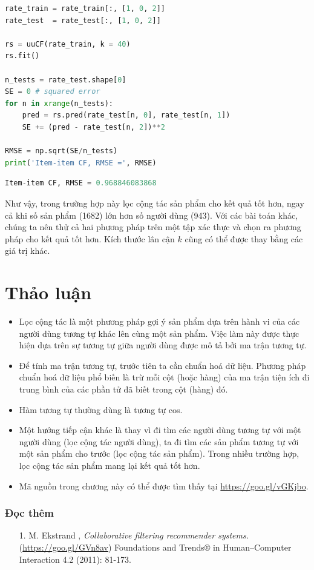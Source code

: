 \begin{lstlisting}[language=Python]
rate_train = rate_train[:, [1, 0, 2]]
rate_test  = rate_test[:, [1, 0, 2]]

rs = uuCF(rate_train, k = 40)
rs.fit()

n_tests = rate_test.shape[0]
SE = 0 # squared error
for n in xrange(n_tests):
    pred = rs.pred(rate_test[n, 0], rate_test[n, 1])
    SE += (pred - rate_test[n, 2])**2 

RMSE = np.sqrt(SE/n_tests)
print('Item-item CF, RMSE =', RMSE)
\end{lstlisting}
\kq 
\begin{lstlisting}[language=Python]
Item-item CF, RMSE = 0.968846083868
\end{lstlisting}
Như vậy, trong trường hợp này lọc cộng tác sản phẩm cho kết quả tốt
hơn, ngay cả khi số sản phẩm (1682) lớn hơn số người dùng (943).
Với các bài toán khác, chúng ta nên thử cả hai phương pháp trên một tập xác thực và chọn
ra phương pháp cho kết quả tốt hơn. Kích thước lân cận $k$ cũng có thể được thay bằng các giá trị khác. 
 
 
\section{Thảo luận}
\label{sec:24_discuss}
\begin{itemize}
    \item Lọc cộng tác là một phương pháp gợi ý sản phẩm dựa trên hành vi của các người dùng tương tự khác lên cùng một
    sản phẩm. Việc làm này được thực hiện dựa trên sự tương tự giữa người dùng được mô tả bởi ma trận tương tự.
 
    \item Để tính ma trận tương tự, trước tiên ta cần chuẩn hoá dữ
    liệu. Phương pháp chuẩn hoá dữ liệu phổ biến là trừ mỗi cột (hoặc hàng) của ma trận tiện ích đi trung bình của các phần tử đã biết trong cột (hàng) đó. 
 
    \item Hàm tương tự thường dùng là tương tự cos. 
 
    \item Một hướng tiếp cận khác là thay vì đi tìm các người dùng tương tự với một người dùng (lọc cộng tác người dùng), ta đi tìm các sản phẩm tương tự
    với một sản phẩm cho trước (lọc cộng tác sản phẩm). Trong nhiều trường hợp, lọc cộng tác sản phẩm mang lại kết quả tốt hơn. 


    \item Mã nguồn trong chương này có thể được tìm thấy tại \url{https://goo.gl/vGKjbo}.
\end{itemize}
 
 
\subsubsection{Đọc thêm}
\begin{enumerate}
    \item[1.] M. Ekstrand \etal, \textit{Collaborative filtering recommender systems.}
    (\url{https://goo.gl/GVn8av}) Foundations and Trends® in Human–Computer Interaction 4.2 (2011): 81-173.
\end{enumerate} 
 
